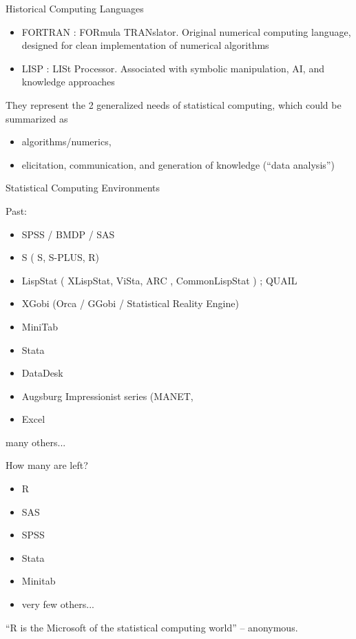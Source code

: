\documentclass{beamer}
\begin{document}
\begin{frame}{Historical Computing Languages}
  \begin{itemize}
  \item FORTRAN : FORmula TRANslator.  Original numerical computing
    language, designed for clean implementation of numerical
    algorithms
  \item LISP : LISt Processor.  Associated with symbolic
    manipulation, AI, and knowledge approaches
  \end{itemize}

  They represent the 2 generalized needs of statistical computing,
  which could be summarized as
  \begin{itemize}
  \item algorithms/numerics,
  \item elicitation, communication, and generation of knowledge (``data
    analysis'')
  \end{itemize}
\end{frame}

\begin{frame}{Statistical Computing Environments}

  Past: 
  \begin{itemize}
  \item SPSS / BMDP / SAS
  \item S ( S, S-PLUS, R)
  \item LispStat ( XLispStat,  ViSta, ARC , CommonLispStat ) ; QUAIL
  \item XGobi (Orca / GGobi / Statistical Reality Engine)
  \item MiniTab
  \item Stata
  \item DataDesk
  \item Augsburg Impressionist series (MANET, 
  \item Excel
  \end{itemize}
  many others...

\end{frame}

\begin{frame}{How many are left?}

  \begin{itemize}
  \item R 
  \item SAS
  \item SPSS
  \item Stata
  \item Minitab
  \item very few others...    
  \end{itemize}
  ``R is the Microsoft of the statistical computing world'' -- anonymous.
\end{frame}
\end{document}
